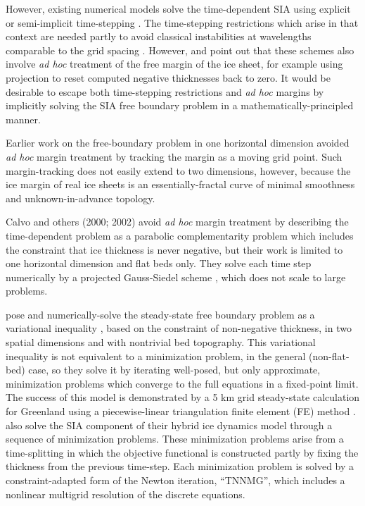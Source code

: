 \documentclass[twocolumn,letterpaper]{igs}
\begin{document}
However, existing numerical models solve the time-dependent SIA using explicit or semi-implicit time-stepping  \citep{Bueleretal2005,EgholmNielsen2010,HindmarshPayne1996,Huybrechtsetal1996,JaroschSchoofAnslow2013}.  The time-stepping restrictions which arise in that context are needed partly to avoid classical instabilities at wavelengths comparable to the grid spacing \citep{MortonMayers2005}.  However, \cite{Bueleretal2005} and \cite{JaroschSchoofAnslow2013} point out that these schemes also involve \emph{ad hoc} treatment of the free margin of the ice sheet, for example using projection to reset computed negative thicknesses back to zero.  It would be desirable to escape both time-stepping restrictions and \emph{ad hoc} margins by implicitly solving the SIA free boundary problem in a mathematically-principled manner.

Earlier work on the free-boundary problem in one horizontal dimension \citep{Hindmarshetal1987,HindmarshHutter1988} avoided \emph{ad hoc} margin treatment by tracking the margin as a moving grid point.  Such margin-tracking does not easily extend to two dimensions, however, because the ice margin of real ice sheets is an essentially-fractal curve of minimal smoothness and unknown-in-advance topology.

Calvo and others (2000; 2002)\nocite{CalvoDuranyVazquez2000,Calvoetal2002} avoid \emph{ad hoc} margin treatment by describing the time-dependent problem as a parabolic complementarity problem which includes the constraint that ice thickness is never negative, but their work is limited to one horizontal dimension and flat beds only.  They solve each time step numerically by a projected Gauss-Siedel scheme \citep{Ciarlet2002}, which does not scale to large problems.  

\cite{JouvetBueler2012} pose and numerically-solve the steady-state free boundary problem as a variational inequality \citep{KinderlehrerStampacchia1980}, based on the constraint of non-negative thickness, in two spatial dimensions and with nontrivial bed topography.  This variational inequality is not equivalent to a minimization problem, in the general (non-flat-bed) case, so they solve it by iterating well-posed, but only approximate, minimization problems which converge to the full equations in a fixed-point limit.  The success of this model is demonstrated by a 5 km grid steady-state calculation for Greenland using a piecewise-linear triangulation finite element (FE) method \citep{Elmanetal2005}.  \cite{JouvetGraeser2013} also solve the SIA component of their hybrid ice dynamics model \citep{Winkelmannetal2011} through a sequence of minimization problems.  These minimization problems arise from a time-splitting in which the objective functional is constructed partly by fixing the thickness from the previous time-step.  Each minimization problem is solved by a constraint-adapted form of the Newton iteration, ``TNNMG'', which includes a nonlinear multigrid resolution of the discrete equations.
\end{document}
